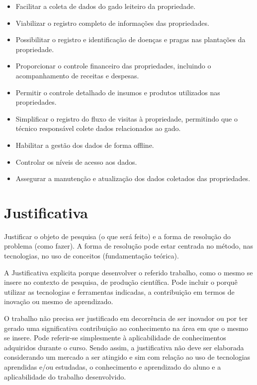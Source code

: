 \begin{itemize}
  \item Facilitar a coleta de dados do gado leiteiro da propriedade.

  \item Viabilizar o registro completo de informações das propriedades.

  \item Possibilitar o registro e identificação de doenças e pragas nas plantações da propriedade.

  \item Proporcionar o controle financeiro das propriedades, incluindo o acompanhamento de receitas e despesas.

  \item Permitir o controle detalhado de insumos e produtos utilizados nas propriedades.

  \item Simplificar o registro do fluxo de visitas à propriedade, permitindo que o técnico responsável colete dados relacionados ao gado.

  \item Habilitar a gestão dos dados de forma offline.

  \item Controlar os níveis de acesso aos dados.

  \item Assegurar a manutenção e atualização dos dados coletados das propriedades.
\end{itemize}

\section{Justificativa}\label{sec:justificativa}

Justificar o objeto de pesquisa (o que será feito) e a forma de resolução do problema (como fazer). A forma de resolução pode estar centrada no método, nas tecnologias, no uso de conceitos (fundamentação teórica).

A Justificativa explicita porque desenvolver o referido trabalho, como o mesmo se insere no contexto de pesquisa, de produção científica. Pode incluir o porquê utilizar as tecnologias e ferramentas indicadas, a contribuição em termos de inovação ou mesmo de aprendizado.

O trabalho não precisa ser justificado em decorrência de ser inovador ou por ter gerado uma significativa contribuição ao conhecimento na área em que o mesmo se insere. Pode referir-se simplesmente à aplicabilidade de conhecimentos adquiridos durante o curso. Sendo assim, a justificativa não deve ser elaborada considerando um mercado a ser atingido e sim com relação ao uso de tecnologias aprendidas e/ou estudadas, o conhecimento e aprendizado do aluno e a aplicabilidade do trabalho desenvolvido.

